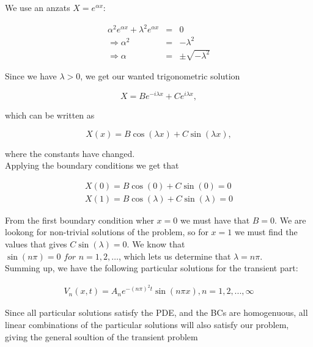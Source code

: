 \documentclass{article}
\begin{document}
We use an anzats $X=e^{\alpha x}$:

\begin{subequations}
	\begin{eqnarray}
	\alpha^2 e^{\alpha x} + \lambda^2 e^{\alpha x} &=& 0 \\ 
	\Rightarrow \alpha^2 &=& -\lambda^2 \\ 
	\Rightarrow \alpha &=& \pm \sqrt{-\lambda^2}
	\end{eqnarray}
\end{subequations}

Since we have $\lambda > 0$, we get our wanted trigonometric solution

\begin{equation}
X = Be^{-i\lambda x} + Ce^{i\lambda x},
\label{eqn:xDependenttransientTerm1D}
\end{equation}

which can be written as

\begin{equation}
X(x) = B\cos(\lambda x) + C\sin(\lambda x),
\end{equation}

where the constants have changed.\\

Applying the boundary conditions we get that

\begin{eqnarray}
X(0) = B\cos(0) + C\sin(0) = 0 \\ 
X(1) = B\cos(\lambda) + C\sin(\lambda) = 0
\end{eqnarray}

From the first boundary condition wher $x=0$ we must have that $B=0$. We are lookong for non-trivial solutions of the problem, so for $x=1$ we must find the  values that gives $C\sin(\lambda)=0$. We know that\\ $\sin(n \pi) =0 \textit{ for } n = 1,2, \ldots $, which lets us determine that $\lambda = n \pi$.\\

Summing up, we have the following particular solutions for the transient part:

\begin{subequations}
	\begin{eqnarray}
	V_n(x,t) = A_ne^{-(n\pi)^2 t}\sin(n \pi x), n=1,2,...,\infty
	\end{eqnarray}
\end{subequations}

Since all particular solutions satisfy the PDE, and the BCs are homogenuous, all linear combinations of the particular solutions will also satisfy our problem, giving the general soultion of the transient problem
\end{document}
